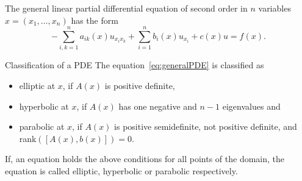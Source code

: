 
\begin{defn}{\quad}
	The general linear partial differential equation of second order in $n$ variables $x=(x_1,\ldots,x_n)$ has the form
	\begin{equation}
		-\sum_{ i, k = 1 }^n a_{ ik } (x) u_{ x_i x_k } + \sum_{ i = 1 }^n b_i (x) u_{ x_i } + c (x) u = f (x).
		\label{eq:generalPDE}
	\end{equation}
\end{defn}

\begin{defn}{Classification of a PDE}
	The equation~\eqref{eq:generalPDE} is classified as
		\begin{itemize}
			\item elliptic at $x$, if $A(x)$ is positive definite,
			\item hyperbolic at $x$, if $A(x)$ has one negative and $n-1$ eigenvalues and
			\item parabolic at $x$, if $A(x)$ is positive semidefinite, not positive definite, and rank$([A(x), b(x)])=0$.  
		\end{itemize}
	
	If, an equation holds the above conditions for all points of the domain, the equation is called elliptic, hyperbolic or parabolic respectively. 
	\end{defn}